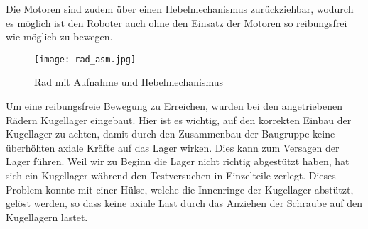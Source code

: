 Die Motoren sind zudem über einen Hebelmechanismus zurückziehbar, wodurch es möglich ist den Roboter auch ohne den Einsatz der Motoren so reibungsfrei wie möglich zu bewegen. 

\begin{figure}[H]
    \begin{center}
    \texttt{[image: rad\_asm.jpg]}
    \end{center}
    \caption{Rad mit Aufnahme und Hebelmechanismus}
\end{figure}

Um eine reibungsfreie Bewegung zu Erreichen, wurden bei den angetriebenen Rädern Kugellager eingebaut. Hier ist es wichtig, auf den korrekten Einbau der Kugellager zu achten, damit durch den Zusammenbau der Baugruppe keine überhöhten axiale Kräfte auf das Lager wirken. Dies kann zum Versagen der Lager führen.  Weil wir zu Beginn die Lager nicht richtig abgestützt haben, hat sich ein Kugellager während den Testversuchen in Einzelteile zerlegt. Dieses Problem konnte mit einer Hülse, welche die Innenringe der Kugellager abstützt, gelöst werden, so dass keine axiale Last durch das Anziehen der Schraube auf den Kugellagern lastet.